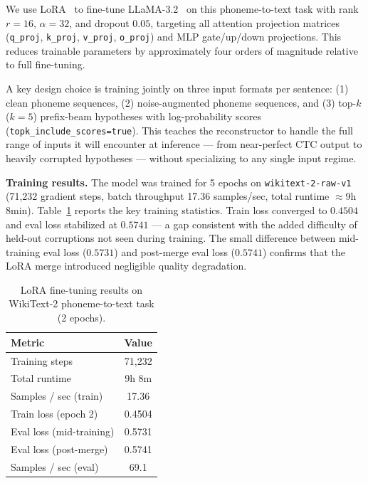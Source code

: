 \documentclass[10pt,twocolumn,letterpaper]{article}
\begin{document}
We use LoRA~\cite{hu2022lora} to fine-tune LLaMA-3.2~\cite{meta2024llama32} on this phoneme-to-text task with rank $r{=}16$, $\alpha{=}32$, and dropout $0.05$, targeting all attention projection matrices (\texttt{q\_proj}, \texttt{k\_proj}, \texttt{v\_proj}, \texttt{o\_proj}) and MLP gate/up/down projections. This reduces trainable parameters by approximately four orders of magnitude relative to full fine-tuning.

A key design choice is training jointly on three input formats per sentence: (1) clean phoneme sequences, (2) noise-augmented phoneme sequences, and (3) top-$k$ ($k{=}5$) prefix-beam hypotheses with log-probability scores (\texttt{topk\_include\_scores=true}). This teaches the reconstructor to handle the full range of inputs it will encounter at inference — from near-perfect CTC output to heavily corrupted hypotheses — without specializing to any single input regime.

\textbf{Training results.} The model was trained for 5 epochs on \texttt{wikitext-2-raw-v1} (71,232 gradient steps, batch throughput 17.36 samples/sec, total runtime $\approx$9h 8min). Table~\ref{tab:lora-training} reports the key training statistics. Train loss converged to $0.4504$ and eval loss stabilized at $0.5741$ — a gap consistent with the added difficulty of held-out corruptions not seen during training. The small difference between mid-training eval loss ($0.5731$) and post-merge eval loss ($0.5741$) confirms that the LoRA merge introduced negligible quality degradation.

\begin{table}[t]
\centering
\small
\caption{LoRA fine-tuning results on WikiText-2 phoneme-to-text task (2 epochs).}
\label{tab:lora-training}
\begin{tabular}{lc}
\toprule
Metric & Value \\
\midrule
Training steps              & 71,232 \\
Total runtime               & 9h 8m \\
Samples / sec (train)       & 17.36 \\
Train loss (epoch 2)        & 0.4504 \\
Eval loss (mid-training)    & 0.5731 \\
Eval loss (post-merge)      & 0.5741 \\
Samples / sec (eval)        & 69.1 \\
\bottomrule
\end{tabular}
\end{table}
\end{document}
